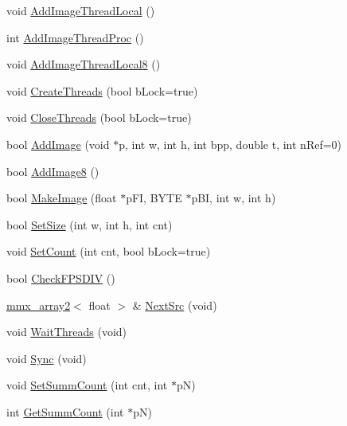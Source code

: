 \begin{DoxyCompactItemize}
\item 
void \hyperlink{class_c_v_i_engine_base_a6ca94a8d39e8a76e5be4698cc2eff06b}{Add\+Image\+Thread\+Local} ()
\item 
int \hyperlink{class_c_v_i_engine_base_ac9fbe14762f4d2bf7d0bffe451a329ee}{Add\+Image\+Thread\+Proc} ()
\item 
void \hyperlink{class_c_v_i_engine_base_a180f4a67ef6b4137c8b8565310aa7834}{Add\+Image\+Thread\+Local8} ()
\item 
void \hyperlink{class_c_v_i_engine_base_a053908c9c2c18583a13e6f6f79c8eeab}{Create\+Threads} (bool b\+Lock=true)
\item 
void \hyperlink{class_c_v_i_engine_base_a0905eba46bb64f25a2d91f8b39a3f994}{Close\+Threads} (bool b\+Lock=true)
\item 
bool \hyperlink{class_c_v_i_engine_base_ac886baeaf14b16970d089edaf6767a79}{Add\+Image} (void $\ast$p, int w, int h, int bpp, double t, int n\+Ref=0)
\item 
bool \hyperlink{class_c_v_i_engine_base_a3fe6ae4f9ac6b9422c22d99878f424f5}{Add\+Image8} ()
\item 
bool \hyperlink{class_c_v_i_engine_base_a3426944a03bac2f5a8c135c217f9cf8c}{Make\+Image} (float $\ast$p\+F\+I, B\+Y\+T\+E $\ast$p\+B\+I, int w, int h)
\item 
bool \hyperlink{class_c_v_i_engine_base_a930661f73cc7c449c166071631be595d}{Set\+Size} (int w, int h, int cnt)
\item 
void \hyperlink{class_c_v_i_engine_base_a042d710f3a5be21538478ad157680828}{Set\+Count} (int cnt, bool b\+Lock=true)
\item 
bool \hyperlink{class_c_v_i_engine_base_a4764b56d4269ed5cd101dddf545e039d}{Check\+F\+P\+S\+D\+I\+V} ()
\item 
\hyperlink{classmmx__array2}{mmx\+\_\+array2}$<$ float $>$ \& \hyperlink{class_c_v_i_engine_base_aa1aa2604f40dd77bc49ca6ff8fd81535}{Next\+Src} (void)
\item 
void \hyperlink{class_c_v_i_engine_base_a305c1b2285ddfcdbb021597f0b3dbd39}{Wait\+Threads} (void)
\item 
void \hyperlink{class_c_v_i_engine_base_af12866653055639e69a61224615af7fe}{Sync} (void)
\item 
void \hyperlink{class_c_v_i_engine_base_a4b6c77fcb50dcb01f299d7e0f4b05ea6}{Set\+Summ\+Count} (int cnt, int $\ast$p\+N)
\item 
int \hyperlink{class_c_v_i_engine_base_adb6193dca9e4f6c71ad6e77df88bc9f7}{Get\+Summ\+Count} (int $\ast$p\+N)
\item 

\end{DoxyCompactItemize}
